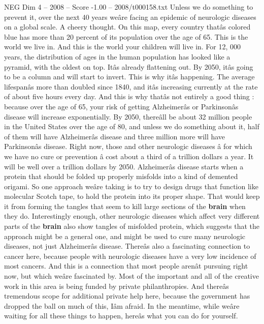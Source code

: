 \begin{textsample}{NEG Dim 4 – 2008 – Score -1.00 – 2008/t000158.txt}  \label{ex:f4_neg_027}
Unless we do something to prevent it, over the next 40 years weâre facing an epidemic of neurologic diseases on a global scale.
A cheery thought.
On this map, every country thatâs colored blue has more than 20 percent of its population over the age of 65.
This is the world we live in.
And this is the world your children will live in.
For 12, 000 years, the distribution of ages in the human population has looked like a pyramid, with the oldest on top.
Itâs already flattening out.
By 2050, itâs going to be a column and will start to invert.
This is why itâs happening.
The average lifespanâs more than doubled since 1840, and itâs increasing currently at the rate of about five hours every day.
And this is why thatâs not entirely a good thing : because over the age of 65, your risk of getting Alzheimerâs or Parkinsonâs disease will increase exponentially.
By 2050, thereâll be about 32 million people in the United States over the age of 80, and unless we do something about it, half of them will have Alzheimerâs disease and three million more will have Parkinsonâs disease.
Right now, those and other neurologic diseases â for which we have no cure or prevention â cost about a third of a trillion dollars a year.
It will be well over a trillion dollars by 2050.
Alzheimerâs disease starts when a protein that should be folded up properly misfolds into a kind of demented origami.
So one approach weâre taking is to try to design drugs that function like molecular Scotch tape, to hold the protein into its proper shape.
That would keep it from forming the tangles that seem to kill large sections of the \textbf{brain} when they do.
Interestingly enough, other neurologic diseases which affect very different parts of the \textbf{brain} also show tangles of misfolded protein, which suggests that the approach might be a general one, and might be used to cure many neurologic diseases, not just Alzheimerâs disease.
Thereâs also a fascinating connection to cancer here, because people with neurologic diseases have a very low incidence of most cancers.
And this is a connection that most people arenât pursuing right now, but which weâre fascinated by.
Most of the important and all of the creative work in this area is being funded by private philanthropies.
And thereâs tremendous scope for additional private help here, because the government has dropped the ball on much of this, Iâm afraid.
In the meantime, while weâre waiting for all these things to happen, hereâs what you can do for yourself.

\end{textsample}
